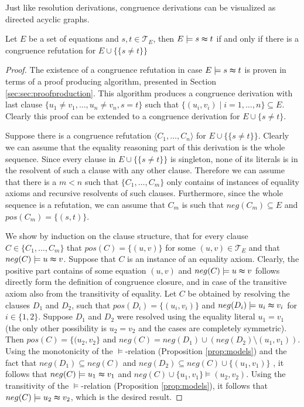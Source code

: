 Just like resolution derivations, congruence derivations can be visualized as directed acyclic graphs.

\begin{proposition}

Let $E$ be a set of equations and $s,t \in \mathcal{T}_E$, then $E \models s \thickapprox t$ if and only if there is a congruence refutation for $E \cup \{\{ s \neq t\}\}$

\end{proposition}

\begin{proof}

The existence of a congruence refutation in case $E \models s \thickapprox t$ is proven in terms of a proof producing algorithm, presented in Section \ref{sec:sec:proofproduction}.
This algorithm produces a congruence derivation with last clause $\{u_1 \neq v_1,\ldots,u_n \neq v_n, s = t\}$ such that $\{(u_i,v_i) \mid i = 1,\ldots,n\} \subseteq E$.
Clearly this proof can be extended to a congruence derivation for $E \cup \{ s \neq t\}$.

Suppose there is a congruence refutation $\langle C_1, \ldots, C_n \rangle$ for $E \cup \{\{ s \neq t\}\}$.
Clearly we can assume that the equality reasoning part of this derivation is the whole sequence.
Since every clause in $E \cup \{\{ s \neq t\}\}$ is singleton, none of its literals is in the resolvent of such a clause with any other clause.
Therefore we can assume that there is a $m < n$ such that $\{C_1, \ldots, C_m\}$ only contains of instances of equality axioms and recursive resolvents of such clauses.
Furthermore, since the whole sequence is a refutation, we can assume that $C_m$ is such that $neg(C_m) \subseteq E$ and $pos(C_m) = \{(s,t)\}$.

We show by induction on the clause structure, that for every clause $C \in \{C_1,\ldots,C_m\}$ that $pos(C) = \{(u,v)\}$ for some $(u,v) \in \mathcal{T}_E$ and that $neg(C) \models u \thickapprox v$.
Suppose that $C$ is an instance of an equality axiom. Clearly, the positive part contains of some equation $(u,v)$ and $neg(C) \models u \thickapprox v$ follows directly form the definition of congruence closure, and in case of the transitive axiom also from the transitivity of equality.
Let $C$ be obtained by resolving the clauses $D_1$ and $D_2$, such that $pos(D_i) = \{(u_i,v_i)\}$ and $neg(D_i) \models u_i \thickapprox v_i$ for $i \in \{1,2\}$.
Suppose $D_1$ and $D_2$ were resolved using the equality literal $u_1 = v_1$ (the only other possibility is $u_2 = v_2$ and the cases are completely symmetric).
Then $pos(C) = \{(u_2,v_2\}$ and $neg(C) = neg(D_1) \cup (neg(D_2) \setminus (u_1,v_1))$.
Using the monotonicity of the $\models$-relation (Proposition \ref{prop:models}) and the fact that $neg(D_1) \subseteq neg(C)$ and $neg(D_2) \subseteq neg(C) \cup \{(u_1,v_1)\}$ , it follows that $neg(C) \models u_1 \thickapprox v_1$ and $neg(C) \cup \{u_1,v_1\} \models (u_2,v_2)$.
Using the transitivity of the $\models$-relation (Proposition \ref{prop:models}), it follows that $neg(C) \models u_2 \thickapprox v_2$, which is the desired result.

\end{proof}